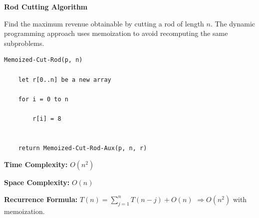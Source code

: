 \documentclass[a4paper,12pt]{article}
\begin{document}
\begin{tcolorbox}[
    colback=gray!30,
    colframe=black,
    boxrule=1pt,
    arc=0mm
]

\begin{tcolorbox}[
    colback=gray!10,
    colframe=black,
    arc=0mm
]
\centering
{\Huge\bfseries Rod Cutting Algorithm}
\end{tcolorbox}


\begin{tcolorbox}[
    colback=gray!10,
    colframe=black,
    arc=0mm
]
\small
Find the maximum revenue obtainable by cutting a rod of length $n$.
The dynamic programming approach uses memoization to avoid recomputing
the same subproblems.
\end{tcolorbox}


\begin{tcolorbox}[
    colback=black!5,
    colframe=black,
    arc=0mm,
    title=Pseudo-code
]
\tiny
\begin{lstlisting}
Memoized-Cut-Rod(p, n)

    let r[0..n] be a new array

    for i = 0 to n

        r[i] = 8


    return Memoized-Cut-Rod-Aux(p, n, r)
\end{lstlisting}
\end{tcolorbox}


\begin{tcolorbox}[
    colback=cyan!20,
    colframe=black,
    arc=0mm
]
\small
\textbf{Time Complexity:}
$O(n^2)$
\end{tcolorbox}


\begin{tcolorbox}[
    colback=violet!20,
    colframe=black,
    arc=0mm
]
\small
\textbf{Space Complexity:}
$O(n)$
\end{tcolorbox}


\begin{tcolorbox}[
    colback=pink!20,
    colframe=black,
    arc=0mm
]
\small
\textbf{Recurrence Formula:}
$T(n)=\sum_{j=1}^{n}T(n-j)+O(n)$
$\Rightarrow O(n^2)$ with memoization.
\end{tcolorbox}

\end{tcolorbox}
\end{document}
